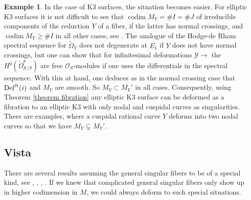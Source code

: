 \documentclass[a4paper,11pt,final]{amsart}
\theoremstyle{plain}
\theoremstyle{definition}
\newtheorem{example}[subsection]{Example}
\numberwithin{equation}{section}
\theoremstyle{remark}
\begin{document}
\begin{example}\label{example k3}
In the case of K3 surfaces, the situation becomes easier. For elliptic K3 surfaces it is not difficult to see that ${\operatorname{codim}} M_Y=\# I= \# J$ of irreducible components of the reduction $Y$ of a fiber, if the latter has normal crossings, and ${\operatorname{codim}} M_Y \geq \# I$ in all other cases, see \cite[Thm VII.3.8]{mydiss}. The analogue of the Hodge-de Rham spectral sequence for ${\widetilde{\Omega}}_Y$ does not degenerate at $E_1$ if $Y$ does not have normal crossings, but one can show that for infinitesimal deformations ${{\mathcal Y}}{\xrightarrow{\ \ }}$ the $H^q({\widetilde{\Omega}}_{{{\mathcal Y}}/S}^p)$ are free ${{\mathcal O}}_S$-modules if one uses the differentials in the spectral sequence. With this at hand, one deduces as in the normal crossing case that ${{\operatorname{Def}}}^{{\rm{lt}}}(i)$ and $M_Y$ are smooth. So $M_Y \subset M_Y'$ in all cases.
Consequently, using Theorem \ref{theorem fibration} any elliptic K3 surface can be deformed as a fibration to an elliptic K3 with only nodal and cuspidal curves as singularities. There are examples, where a cuspidal rational curve $Y$ deforms into two nodal curves so that we have $M_Y \subsetneq M_Y'$. 
\end{example}
\subsection{Vista}\label{sec generalizations}
There are several results assuming the general singular fibers to be of a special kind, see \cite{HO10}, \cite{Sa08}, \cite{Sa12}, \cite{Th}. If we knew that complicated general singular fibers only show up in higher codimension in $M$, we could always deform to such special situations. 
\end{document}
